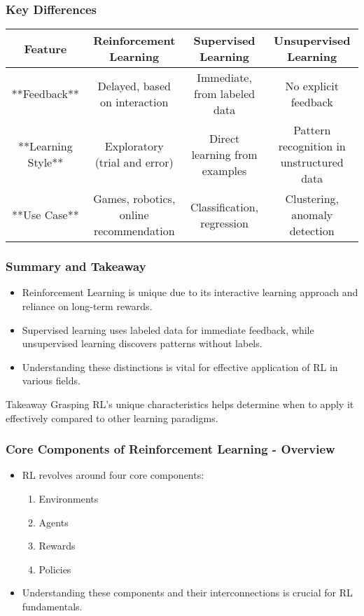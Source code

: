 \documentclass[aspectratio=169]{beamer}
\begin{document}
\begin{frame}[fragile]
    \frametitle{Key Differences}
    \begin{table}[ht]
        \centering
        \begin{tabular}{|c|c|c|c|}
            \hline
            Feature              & Reinforcement Learning                   & Supervised Learning                       & Unsupervised Learning                \\
            \hline
            **Feedback**         & Delayed, based on interaction           & Immediate, from labeled data             & No explicit feedback                 \\
            \hline
            **Learning Style**   & Exploratory (trial and error)          & Direct learning from examples             & Pattern recognition in unstructured data \\
            \hline
            **Use Case**         & Games, robotics, online recommendation  & Classification, regression               & Clustering, anomaly detection         \\
            \hline
        \end{tabular}
    \end{table}
\end{frame}

\begin{frame}[fragile]
    \frametitle{Summary and Takeaway}
    \begin{itemize}
        \item Reinforcement Learning is unique due to its interactive learning approach and reliance on long-term rewards.
        \item Supervised learning uses labeled data for immediate feedback, while unsupervised learning discovers patterns without labels.
        \item Understanding these distinctions is vital for effective application of RL in various fields.
    \end{itemize}
    \begin{block}{Takeaway}
        Grasping RL’s unique characteristics helps determine when to apply it effectively compared to other learning paradigms.
    \end{block}
\end{frame}

\begin{frame}[fragile]
    \frametitle{Core Components of Reinforcement Learning - Overview}
    \begin{itemize}
        \item RL revolves around four core components:
        \begin{enumerate}
            \item Environments
            \item Agents
            \item Rewards
            \item Policies
        \end{enumerate}
        \item Understanding these components and their interconnections is crucial for RL fundamentals.
    \end{itemize}
\end{frame}
\end{document}
